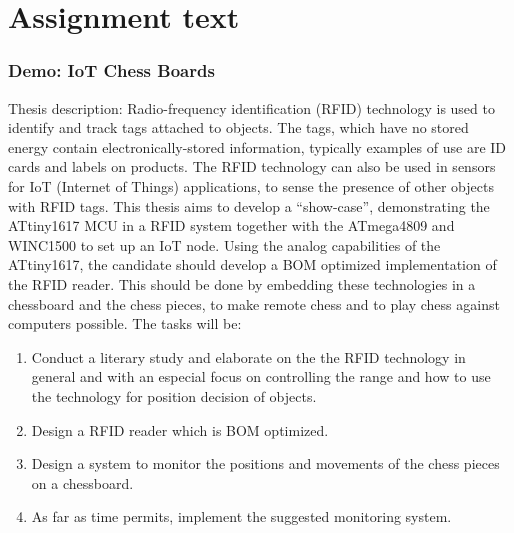 \chapter*{Assignment text}
\subsection*{Demo: IoT Chess Boards}

Thesis description: Radio-frequency identification (RFID) technology is used to identify and track tags attached to objects. The tags, which have no stored energy contain electronically-stored information, typically examples of use are ID cards and labels on products. The RFID technology can also be used in sensors for IoT (Internet of Things) applications, to sense the presence of other objects with RFID tags. 
\newline\newline
This thesis aims to develop a “show-case”, demonstrating the ATtiny1617 MCU in a RFID system together with the ATmega4809 and WINC1500 to set up an IoT node. Using the analog capabilities of the ATtiny1617, the candidate should develop a BOM optimized implementation of the RFID reader. This should be done by embedding these technologies in a chessboard and the chess pieces, to make remote chess and to play chess against computers possible.
\newline\newline
The tasks will be:
\begin{enumerate}
    \item Conduct a literary study and elaborate on the the RFID technology in general and with an especial focus on controlling the range and how to use the technology for position decision of objects.
    \item Design a RFID reader which is BOM optimized.
    \item Design a system to monitor the positions and movements of the chess pieces on a chessboard.
    \item As far as time permits, implement the suggested monitoring system.
\end{enumerate}
 
